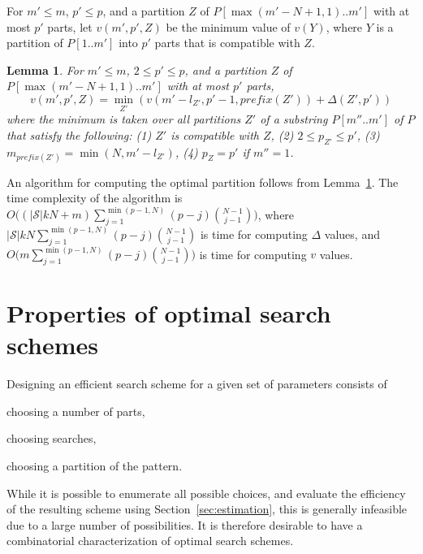 \documentclass[12pt]{article}
\newtheorem{lemma}[theorem]{Lemma}
\newcommand{\substr}[3]{#1[#2..#3]}
\newcommand{\scheme}{\mathcal{S}}
\newcommand{\lognc}{N}
\newcommand{\ppartition}{Y}
\newcommand{\spartition}{Z}
\newcommand{\plen}[1]{m_{#1}}
\newcommand{\plast}[1]{l_{#1}}
\newcommand{\pnumparts}[1]{p_{#1}}
\newcommand{\pprefix}[1]{\mathit{prefix}(#1)}
\newcommand{\optv}[3]{v(#1,#2,#3)}
\begin{document}
For $m'\leq m$, $p' \leq p$, and a partition $\spartition$ of
$\substr{P}{\max(m'-\lognc+1,1)}{m'}$ with at most $p'$ parts,
let $\optv{m'}{p'}{\spartition}$ be the minimum value of $v(\ppartition)$,
where $\ppartition$ is a partition of $\substr{P}{1}{m'}$ into $p'$ parts
that is compatible with $\spartition$.
\begin{lemma}\label{lem:optimal-3}
For $m' \leq m$, $2 \leq p' \leq p$, and a partition $\spartition$ of
$\substr{P}{\max(m'-\lognc+1,1)}{m'}$ with at most $p'$ parts,
\[
\optv{m'}{p'}{\spartition} = \min_{\spartition'} \left(
  \optv{m'-\plast{\spartition'}}{p'-1}{\pprefix{\spartition'}} +
  \Delta(\spartition',p') 
\right)
\]
where the minimum is taken over all partitions $\spartition'$
of a substring $\substr{P}{m''}{m'}$ of $P$ that satisfy the following:
(1) $\spartition'$ is compatible with $\spartition$,
(2) $2 \leq \pnumparts{\spartition'} \leq p'$,
(3) $\plen{\pprefix{\spartition'}} = \min(\lognc, m'-\plast{\spartition'})$,
(4) $\pnumparts{\spartition} = p'$ if $m'' = 1$.
\end{lemma}
An algorithm for computing the optimal partition follows from
Lemma~\ref{lem:optimal-3}.
The time complexity of the algorithm is
$O\big( {(|\scheme| k\lognc+m)}
\sum_{j=1}^{\min(p-1,\lognc)}(p-j)\binom{\lognc-1}{j-1}\big)$, where
$|\scheme| k\lognc
\sum_{j=1}^{\min(p-1,\lognc)}(p-j)\binom{\lognc-1}{j-1}$ is time for
computing $\Delta$ values, and $O\big(m
\sum_{j=1}^{\min(p-1,\lognc)}(p-j)\binom{\lognc-1}{j-1}\big)$ is time
for computing $v$ values. 

\section{Properties of optimal search schemes}\label{sec:design}

Designing an efficient search scheme for a given set of parameters consists
of
\begin{inparaenum}[(1)]
\item choosing a number of parts,
\item choosing searches, \item choosing a partition of the pattern.
\end{inparaenum}
While it is possible to enumerate all possible choices, and 
evaluate the efficiency of the resulting scheme using
Section~\ref{sec:estimation}, this is generally infeasible due to a large
number of possibilities.
It is therefore desirable to have a combinatorial characterization of
optimal search schemes.
\end{document}
